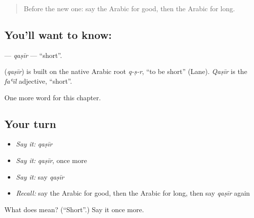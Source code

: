\begin{quote}
Before the new one: say the Arabic for good, then the Arabic for long.
\end{quote}

\subsection*{You'll want to know: }
\textbf{} — \emph{qaṣīr} — \textquotedblleft{}short\textquotedblright{}.

\begin{cousinweb}
\textbf{} (\emph{qaṣīr}) is built on the native Arabic root \emph{q-ṣ-r}, \textquotedblleft{}to be short\textquotedblright{} (Lane). \emph{Qaṣīr} is the \emph{faʿīl} adjective, \textquotedblleft{}short\textquotedblright{}.
\end{cousinweb}

\begin{grammarlens}[title={What you've built}]
One more word for this chapter.
\end{grammarlens}

\subsection*{Your turn}
\begin{itemize}
\raggedright
  \item \emph{Say it:} \emph{qaṣīr}
  \item \emph{Say it:} \emph{qaṣīr}, once more
  \item \emph{Say it:} say \emph{qaṣīr}
  \item \emph{Recall:} say the Arabic for good, then the Arabic for long, then say \emph{qaṣīr} again
\end{itemize}

\begin{tcolorbox}[breakable,colback=teal!4,colframe=teal!35!black,title={Before you move on}]
What does  mean? (\textquotedblleft{}Short\textquotedblright{}.) Say it once more.
\end{tcolorbox}

